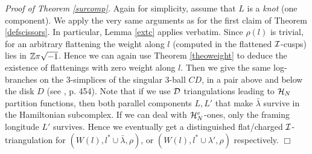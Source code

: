 {\it Proof of Theorem \ref{surcomp}.} Again for simplicity, assume
that $L$ is a {\it knot} (one component).  We apply the very same
arguments as for the first claim of Theorem \ref{defscissors}. In
particular, Lemma \ref{extc} applies verbatim. Since $\rho(l)$ is
trivial, for an arbitrary flattening the weight along $l$ (computed in
the flattened ${\mathcal I}$-cusps) lies in $\mathbb{Z}\pi\sqrt{-1}$. Hence we can
again use Theorem \ref{theoweight} to deduce the existence of
flattenings with zero weight along $l$. Then we give the same
log-branches on the $3$-simplices of the singular $3$-ball $CD$, in a
pair above and below the disk $D$ (see \cite{N}, p. 454). Note that if
we use ${\mathcal D}$ triangulations leading to ${\mathcal H}_N$ partition functions,
then both parallel components $L,L'$ that make $\bar \lambda$ survive
in the Hamiltonian subcomplex. If we can deal with ${\mathcal H}_N^e$-ones,
only the framing longitude $L'$ survives.  Hence we eventually get a
distinguished flat/charged ${\mathcal I}$-triangulation for $(W(l),l^* \cup
\bar{\lambda},\rho)$, or $(W(l),l^* \cup
\lambda',\rho)$ respectively. \hfill$\Box$

